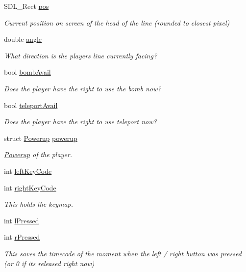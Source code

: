 \begin{DoxyCompactItemize}
S\+D\+L\+\_\+\+Rect \hyperlink{classPlayer_a8f4ab33d4123e6268970d9482f93a335}{pos}
\begin{DoxyCompactList}\small\item\em Current position on screen of the head of the line (rounded to closest pixel) \end{DoxyCompactList}\item 
double \hyperlink{classPlayer_a97cc0b81477c691d1050befc88d57285}{angle}
\begin{DoxyCompactList}\small\item\em What direction is the player\textquotesingle{}s line currently facing? \end{DoxyCompactList}\item 
bool \hyperlink{classPlayer_a48611607e9ae32c375471ce7347f6e21}{bomb\+Avail}
\begin{DoxyCompactList}\small\item\em Does the player have the right to use the bomb now? \end{DoxyCompactList}\item 
bool \hyperlink{classPlayer_ac3a0aaedb90e87c36bbfb19d5092cb7b}{teleport\+Avail}
\begin{DoxyCompactList}\small\item\em Does the player have the right to use teleport now? \end{DoxyCompactList}\item 
struct \hyperlink{classPowerup}{Powerup} \hyperlink{classPlayer_ac935cf0ac990dabc5d2bb344c3e9685d}{powerup}
\begin{DoxyCompactList}\small\item\em \hyperlink{classPowerup}{Powerup} of the player. \end{DoxyCompactList}\item 
int \hyperlink{classPlayer_a865b251c8ca4efb1aade99949f08aa3e}{left\+Key\+Code}
\item 
int \hyperlink{classPlayer_a6caf1b82bbc044e0e14ed81f929142ae}{right\+Key\+Code}
\begin{DoxyCompactList}\small\item\em This holds the keymap. \end{DoxyCompactList}\item 
int \hyperlink{classPlayer_a1af72ec313e22fa17c7298b7ddde46ab}{l\+Pressed}
\item 
int \hyperlink{classPlayer_a025ccf2fab2797437686a9d4b88147b7}{r\+Pressed}
\begin{DoxyCompactList}\small\item\em This saves the timecode of the moment when the left / right button was pressed (or 0 if it\textquotesingle{}s released right now) \end{DoxyCompactList}\item 

\end{DoxyCompactItemize}
